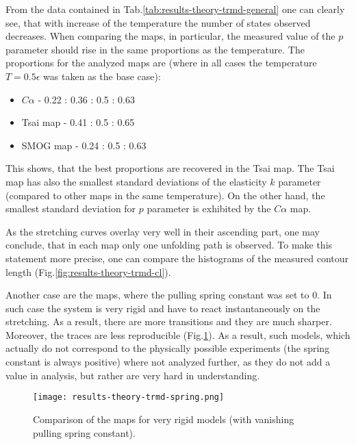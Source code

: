 From the data contained in Tab.\ref{tab:results-theory-trmd-general} one can clearly see, that with increase of the temperature the number of states observed decreases.
When comparing the maps, in particular, the measured value of the $p$ parameter should rise in the same proportions as the temperature.
The proportions for the analyzed maps are (where in all cases the temperature $T=0.5\epsilon$ was taken as the base case):
\begin{itemize}
    \item $C\alpha$ - 0.22 : 0.36 : 0.5 : 0.63
    \item Tsai map - 0.41 : 0.5 : 0.65
    \item SMOG map - 0.24 : 0.5 : 0.63
\end{itemize}

This shows, that the best proportions are recovered in the Tsai map.
The Tsai map has also the smallest standard deviations of the elasticity $k$ parameter (compared to other maps in the same temperature).
On the other hand, the smallest standard deviation for $p$ parameter is exhibited by the $C\alpha$ map.

As the stretching curves overlay very well in their ascending part, one may conclude, that in each map only one unfolding path is observed.
To make this statement more precise, one can compare the histograms of the measured contour length (Fig.\ref{fig:results-theory-trmd-cl}).


Another case are the maps, where the pulling spring constant was set to 0.
In such case the system is very rigid and have to react instantaneously on the stretching.
As a result, there are more transitions and they are much sharper.
Moreover, the traces are less reproducible (Fig.\ref{fig:results-theory-trmd-spring}).
As a result, such models, which actually do not correspond to the physically possible experiments (the spring constant is always positive) where not analyzed further, as they do not add a value in analysis, but rather are very hard in understanding.

\begin{figure}
    \centering
    \texttt{[image: results-theory-trmd-spring.png]}
    \caption{Comparison of the maps for very rigid models (with vanishing pulling spring constant).}
    \label{fig:results-theory-trmd-spring}
\end{figure}

